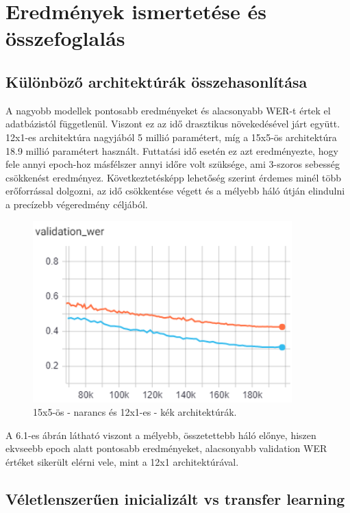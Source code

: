 \chapter{Eredmények ismertetése és összefoglalás}

\section{Különböző architektúrák összehasonlítása}

A nagyobb modellek pontosabb eredményeket és alacsonyabb WER-t értek el adatbázistól függetlenül. Viszont ez az idő drasztikus növekedésével járt együtt. 12x1-es architektúra nagyjából 5 millió paramétert, míg a 15x5-ös architektúra 18.9 millió paramétert használt. Futtatási idő esetén ez azt eredményezte, hogy fele annyi epoch-hoz másfélszer annyi időre volt szüksége, ami 3-szoros sebesség csökkenést eredményez. Következtetésképp lehetőség szerint érdemes minél több erőforrással dolgozni, az idő csökkentése végett és a mélyebb háló útján elindulni a precízebb végeredmény céljából.

\begin{figure}[!ht]
\centering
\includegraphics[width=100mm, keepaspectratio]{figures/architecture_12x1_vs_15x5.png}
\caption{15x5-ös - narancs és 12x1-es - kék architektúrák.}
\end{figure}

A 6.1-es ábrán látható viszont a mélyebb, összetettebb háló előnye, hiszen ekvseebb epoch alatt pontosabb eredményeket, alacsonyabb validation WER értéket sikerült elérni vele, mint a 12x1 architektúrával.

\section{Véletlenszerűen inicializált vs transfer learning}

